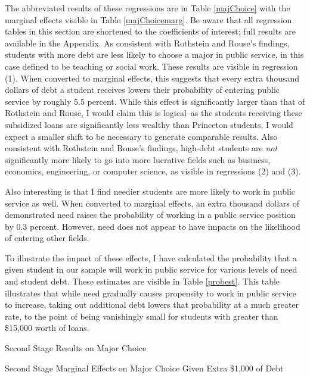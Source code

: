 \documentclass[12pt]{article}
\newcommand{\regs}{../Analysis/Regressions/Output/}
\begin{document}
	The abbreviated results of these regressions are in Table \ref{majChoice} with the marginal effects visible in Table \ref{majChoicemarg}. Be aware that all regression tables in this section are shortened to the coefficients of interest; full results are available in the Appendix. As consistent with Rothstein and Rouse's findings, students with more debt are less likely to choose a major in public service, in this case defined to be teaching or social work. These results are visible in regression (1). When converted to marginal effects, this suggests that every extra thousand dollars of debt a student receives lowers their probability of entering public service by roughly 5.5 percent. While this effect is significantly larger than that of Rothstein and Rouse, I would claim this is logical--as the students receiving these subsidized loans are significantly less wealthy than Princeton students, I would expect a smaller shift to be necessary to generate comparable results. Also consistent with Rothstein and Rouse's findings, high-debt students are \emph{not} significantly more likely to go into more lucrative fields such as business, economics, engineering, or computer science, as visible in regressions (2) and (3). 
	
	Also interesting is that I find needier students are more likely to work in public service as well. When converted to marginal effects, an extra thousand dollars of demonstrated need raises the probability of working in a public service position by 0.3 percent. However, need does not appear to have impacts on the likelihood of entering other fields.
	
	To illustrate the impact of these effects, I have calculated the probability that a given student in our sample will work in public service for various levels of need and student debt. These estimates are visible in Table \ref{probest}. This table illustrates that while need gradually causes propensity to work in public service to increase, taking out additional debt lowers that probability at a much greater rate, to the point of being vanishingly small for students with greater than \$15,000 worth of loans.

	\begin{table}
		\centering
		\caption{Second Stage Results on Major Choice}	
		\resizebox{\textwidth}{!}{	
			
		}
		\label{majChoice}
	\end{table}

	\begin{table}
		\centering
		\caption{Second Stage Marginal Effects on Major Choice Given Extra \$1,000 of Debt}	
		\resizebox{\textwidth}{!}{	
			
		}
		\label{majChoicemarg}
	\end{table}
\end{document}
